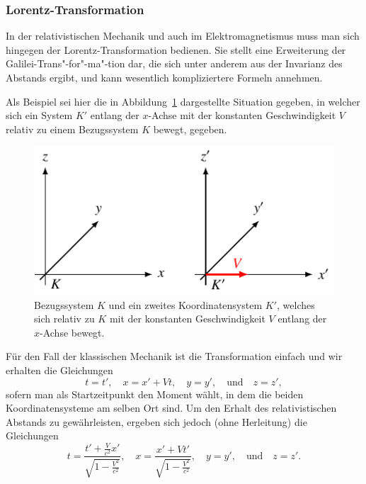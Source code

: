 \subsubsection{Lorentz-Transformation 
\label{relativ:section:lorentz-trafo}}

In der relativistischen Mechanik und auch im Elektromagnetismus
muss man sich hingegen der Lorentz-Transformation bedienen.
Sie stellt eine Erweiterung der Galilei-Trans"-for"-ma"-tion dar,
die sich unter anderem aus der Invarianz des Abstands ergibt,
und kann wesentlich kompliziertere Formeln annehmen.

Als Beispiel sei hier die in Abbildung~\ref{relativ:fig:lorentz-trafo-koords}
dargestellte Situation gegeben, in welcher sich ein System \(K'\)
entlang der \(x\)-Achse mit der konstanten Geschwindigkeit \(V\)
relativ zu einem Bezugssystem \(K\) bewegt, gegeben.
\begin{figure}
    \centering
    \includegraphics{papers/relativ/tikz/lorentz-trafo-koord.pdf}
    \caption{Bezugssystem \(K\) und ein zweites Koordinatensystem \(K'\),
    welches sich relativ zu \(K\) mit der konstanten Geschwindigkeit \(V\)
    entlang der \(x\)-Achse bewegt.
    \label{relativ:fig:lorentz-trafo-koords}}
\end{figure}
Für den Fall der klassischen Mechanik ist die Transformation einfach und
wir erhalten die Gleichungen
\begin{equation}
    t = t', \quad
    x = x' + Vt, \quad
    y = y', \quad \text{und} \quad
    z = z',
    \label{relativ:eqn:galilei-trafo-beisp}
\end{equation}
sofern man als Startzeitpunkt den Moment wählt,
in dem die beiden Koordinatensysteme am selben Ort sind.
Um den Erhalt des relativistischen Abstands zu gewährleisten,
ergeben sich jedoch (ohne Herleitung) die Gleichungen
\begin{equation}
    t = \frac{t' + \frac{V}{c^2}x'}{\sqrt{1-\frac{V^2}{c^2}}}, \quad
    x = \frac{x' + V t'}{\sqrt{1 - \frac{V^2}{c^2}}}, \quad
    y = y', \quad \text{und} \quad
    z = z'.
    \label{relativ:eqn:lorentz-trafo-beisp}
\end{equation}

